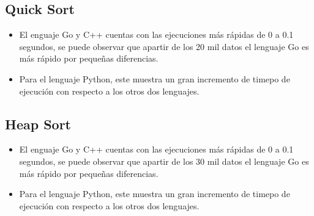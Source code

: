 \documentclass{article}
\begin{document}
	
	\subsection{Quick Sort}
		\begin{itemize}
			\item El enguaje Go y C++ cuentas con las ejecuciones más rápidas de 0 a 0.1 segundos, se puede observar que apartir de los 20 mil datos el lenguaje Go es más rápido por pequeñas diferencias.
			\item Para el lenguaje Python, este muestra un gran incremento de timepo de ejecución con respecto a los otros dos lenguajes.        
		\end{itemize}
	
	\subsection{Heap Sort}
		\begin{itemize}
			\item El enguaje Go y C++ cuentas con las ejecuciones más rápidas de 0 a 0.1 segundos, se puede observar que apartir de los 30 mil datos el lenguaje Go es más rápido por pequeñas diferencias.
			\item Para el lenguaje Python, este muestra un gran incremento de timepo de ejecución con respecto a los otros dos lenguajes.        
		\end{itemize}
		
	
\end{document}
